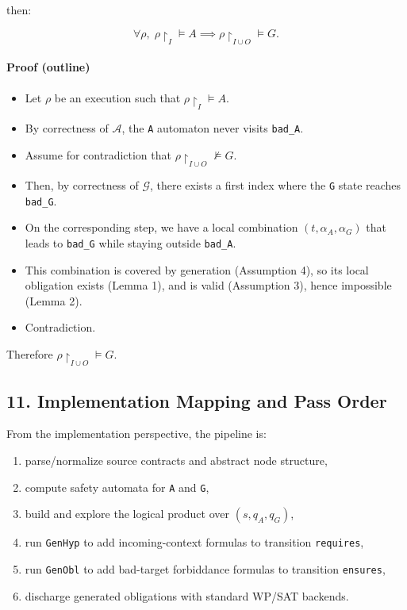 \documentclass[
]{article}
\providecommand{\tightlist}{%
  \setlength{\itemsep}{0pt}\setlength{\parskip}{0pt}}
\begin{document}
then:

\[
\forall \rho,\; \rho\!\upharpoonright_{I} \models A
\implies
\rho\!\upharpoonright_{I\cup O} \models G.
\]

\paragraph{Proof (outline)}\label{proof-outline}

\begin{itemize}
\tightlist
\item
  Let \(\rho\) be an execution such that
  \(\rho\!\upharpoonright_{I} \models A\).
\item
  By correctness of \(\mathcal A\), the \texttt{A} automaton never
  visits \texttt{bad\_A}.
\item
  Assume for contradiction that
  \(\rho\!\upharpoonright_{I\cup O} \not\models G\).
\item
  Then, by correctness of \(\mathcal G\), there exists a first index
  where the \texttt{G} state reaches \texttt{bad\_G}.
\item
  On the corresponding step, we have a local combination
  \((t,\alpha_A,\alpha_G)\) that leads to \texttt{bad\_G} while staying
  outside \texttt{bad\_A}.
\item
  This combination is covered by generation (Assumption 4), so its local
  obligation exists (Lemma 1), and is valid (Assumption 3), hence
  impossible (Lemma 2).
\item
  Contradiction.
\end{itemize}

Therefore \(\rho\!\upharpoonright_{I\cup O} \models G\).

\subsection{11. Implementation Mapping and Pass
Order}\label{implementation-mapping-and-pass-order}

From the implementation perspective, the pipeline is:

\begin{enumerate}
\def\labelenumi{\arabic{enumi}.}
\tightlist
\item
  parse/normalize source contracts and abstract node structure,
\item
  compute safety automata for \texttt{A} and \texttt{G},
\item
  build and explore the logical product over \((s,q_A,q_G)\),
\item
  run \texttt{GenHyp} to add incoming-context formulas to transition
  \texttt{requires},
\item
  run \texttt{GenObl} to add bad-target forbiddance formulas to
  transition \texttt{ensures},
\item
  discharge generated obligations with standard WP/SAT backends.
\end{enumerate}
\end{document}
